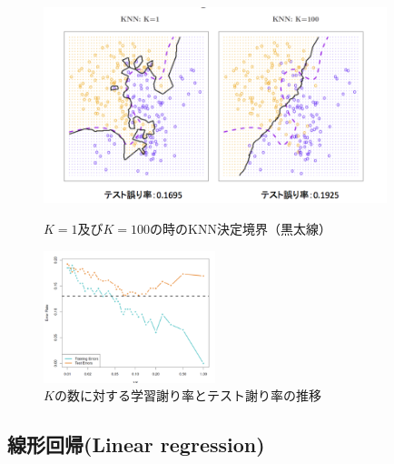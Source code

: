 \documentclass[uplatex]{jsarticle}
\begin{document}
\begin{figure}[htbp]
\begin{minipage}{0.7\hsize}
 \begin{center}
  \includegraphics[width=100mm]{img/knn_knum.png}
 \end{center}
 \caption{$K=1及びK=100$の時のKNN決定境界（黒太線）}
 \label{fig:one}
\end{minipage}
\begin{minipage}{0.3\hsize}
 \begin{center}
  \includegraphics[width=50mm]{img/knn_eror.png}
 \end{center}
 \caption{$K$の数に対する学習謝り率とテスト謝り率の推移}
 \label{fig:two}
\end{minipage}
\end{figure}

\subsection{線形回帰(Linear regression)}
\end{document}
